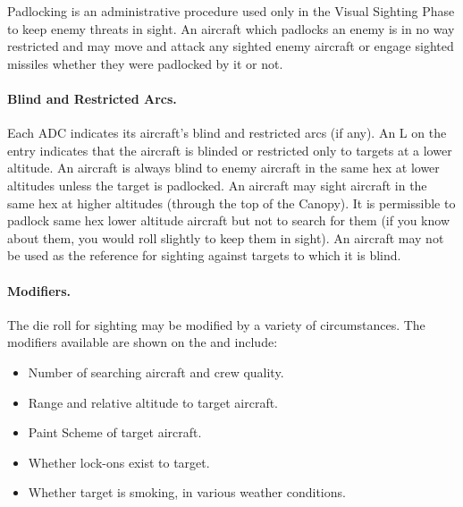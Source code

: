 Padlocking is an administrative procedure used only in the Visual Sighting Phase to keep enemy threats in sight. An aircraft which padlocks an enemy is in no way restricted and may move and attack any sighted enemy aircraft or engage sighted missiles whether they were padlocked by it or not. 

\paragraph{Blind and Restricted Arcs.} Each ADC indicates its aircraft's blind and restricted arcs (if any). An L on the entry indicates that the aircraft is blinded or restricted only to targets at a lower altitude. An aircraft is always blind to enemy aircraft in the same hex at lower altitudes unless the target is padlocked. An aircraft may sight aircraft in the same hex at higher altitudes (through the top of the Canopy). It is permissible to padlock same hex lower altitude aircraft but not to search for them (if you know about them, you would roll slightly to keep them in sight). An aircraft may not be used as the reference for sighting against targets to which it is blind.




\paragraph{Modifiers.} The die roll for sighting may be modified by a variety of circumstances. The modifiers available are shown on the  and include:

\begin{itemize}
    \item Number of searching aircraft and crew quality.
    \item Range and relative altitude to target aircraft.
    \item Paint Scheme of target aircraft.
    \item Whether lock-ons exist to target.
    \item Whether target is smoking,  in various weather conditions.
\end{itemize}

